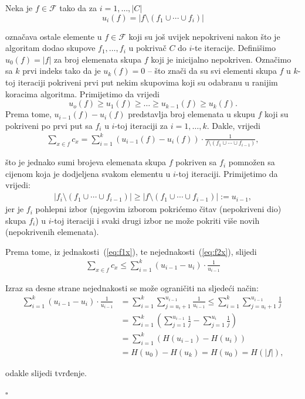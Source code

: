 \documentclass[a4paper, utf8, 11pt, colorlinks]{book}
\newenvironment{proof}{{Dokaz:}}{\hfill$\square$}
\begin{document}
\begin{proof}
	 Neka je $f\in \mathcal{F}$ tako da za $i=1,\ldots,|C|$
	 $$u_i(f) = |f \setminus (f_1 \cup \cdots \cup f_{i} )|$$
	 
	 označava ostale elemente u $f \in \mathcal{F}$ koji su još uvijek nepokriveni nakon što je algoritam dodao skupove $f_1,\ldots, f_i$ u pokrivač $C$ do $i$-te iteracije. Definišimo $u_0(f)=|f|$ za broj elemenata skupa $f$ koji je inicijalno nepokriven. 
	 Označimo sa $k$ prvi indeks tako da je $u_k(f)=0$  -- što znači da su svi elementi skupa $f$ u $k$-toj iteraciji
	 pokriveni prvi put nekim skupovima %
	 koji su odabranu u ranijim koracima algoritma. Primijetimo da vrijedi
	 $$ u_o(f) \geq u_1(f) \geq \ldots \geq u_{k-1}(f) \geq u_k(f).$$
	 Prema tome, $u_{i-1}(f) - u_{i}(f)$ predstavlja broj elemenata u skupu $f$ koji su pokriveni 
	 po prvi put sa $f_i$ u $i$-toj iteraciji za $i=1,\ldots,k$. Dakle, vrijedi
	 \begin{align}\label{eq:q1}
	 	\sum_{x \in f} c_x = \sum_{i=1}^k( u_{i-1}(f) - u_{i}(f)) \cdot \frac{1}{ f \setminus ( f_1 \cup \cdots \cup f_{i-1})},
	 \end{align}
 
   \noindent što je jednako sumi brojeva elemenata skupa $f$ pokriven sa $f_i$ pomnožen sa cijenom koja je dodjeljena svakom elementu u $i$-toj iteraciji. Primijetimo da vrijedi:
 \begin{align}\label{eq:q2x}
 	|f_i \setminus (f_1 \cup \cdots \cup f_{i-1})| \geq | f   \setminus (f_1 \cup \cdots \cup f_{i-1}) | := u_{i-1},
 \end{align}
 jer je $f_i$ pohlepni izbor (njegovim izborom pokrićemo čitav (nepokriveni dio) skupa $f_i$) u $i$-toj iteraciji i svaki drugi izbor ne može pokriti više novih (nepokrivenih elemenata). 
 
 Prema tome, iz jednakosti~(\ref{eq:f1x}), te nejednakosti~(\ref{eq:f2x}), slijedi 
 \begin{align*}
 	\sum_{x \in f} c_x \leq \sum_{i=1}^k ( u_{i-1} - u_{i}) \cdot \frac{1}{u_{i-1}}
 \end{align*}
 
 Izraz sa desne strane nejednakosti se može ograničiti na sljedeći način:
   \begin{align*}
 	   \sum_{i=1}^k ( u_{i-1} - u_{i}) \cdot \frac{1}{u_{i-1}} &= \sum_{i=1}^k \sum_{j=u_i + 1}^{u_{i-1}} \frac{1}{u_{i-1}} \leq \sum_{i=1}^k \sum_{j=u_i + 1}^{u_{i-1}}\frac{1}{j} \\
 	   &= \sum_{i=1}^k \left( \sum_{j=1}^{u_{i-1}}\frac{1}{j} - \sum_{j=1}^{u_{i}}\frac{1}{j} \right) \\
 	   &= \sum_{i=1}^k (H(u_{i-1}) - H(u_i)) \\
    	&= H(u_0) - H(u_k) = H(u_0) = H(|f|),
 \end{align*}
 
 odakle slijedi tvrđenje. 
 
\end{proof}
\end{document}

